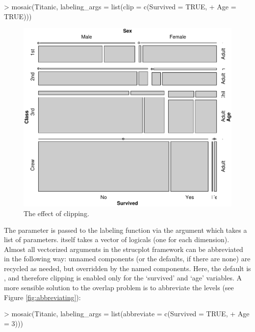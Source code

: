 \documentclass[a4paper]{article}
\begin{document}
\begin{Schunk}
\begin{Sinput}
> mosaic(Titanic, labeling_args = list(clip = c(Survived = TRUE, 
+     Age = TRUE)))
\end{Sinput}
\end{Schunk}

\begin{figure}[p]
\begin{center}
\includegraphics{labeling-clippingfig}
\caption{The effect of clipping.}
\label{fig:clipping}
\end{center}
\end{figure}

\noindent The  parameter is passed to the labeling function
via the  argument which takes a list of
parameters.  itself takes a vector of logicals (one for
each dimension). 
Almost all vectorized arguments in the strucplot
framework can be abbreviated in the following way: unnamed components
(or the defaults, if there are none) are recycled as needed, but
overridden by the named components. Here, the default is ,
and therefore clipping is enabled only for the `survived' and `age' variables.
A more sensible solution to the overlap problem is to abbreviate the 
levels (see Figure \ref{fig:abbreviating}):

\begin{Schunk}
\begin{Sinput}
> mosaic(Titanic, labeling_args = list(abbreviate = c(Survived = TRUE, 
+     Age = 3)))
\end{Sinput}
\end{Schunk}
\end{document}
